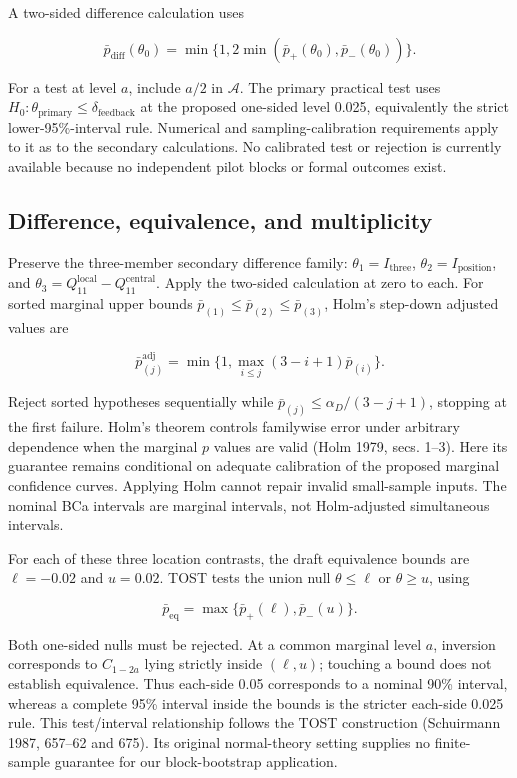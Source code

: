 \documentclass[
  english,
  11pt,
]{article}
\begin{document}
A two-sided difference calculation uses

\[
\bar p_{\mathrm{diff}}(\theta_0)=
\min\{1,2\min(\bar p_+(\theta_0),\bar p_-(\theta_0))\}.
\]

For a test at level \(a\), include \(a/2\) in \(\mathcal A\). The
primary practical test uses
\(H_0:\theta_{\mathrm{primary}}\leq\delta_{\mathrm{feedback}}\) at the
proposed one-sided level 0.025, equivalently the strict
lower-95\%-interval rule. Numerical and sampling-calibration
requirements apply to it as to the secondary calculations. No calibrated
test or rejection is currently available because no independent pilot
blocks or formal outcomes exist.

\subsection{Difference, equivalence, and
multiplicity}\label{difference-equivalence-and-multiplicity}

Preserve the three-member secondary difference family:
\(\theta_1=I_{\mathrm{three}}\), \(\theta_2=I_{\mathrm{position}}\), and
\(\theta_3=Q_{11}^{\mathrm{local}}-Q_{11}^{\mathrm{central}}\). Apply
the two-sided calculation at zero to each. For sorted marginal upper
bounds \(\bar p_{(1)}\leq\bar p_{(2)}\leq\bar p_{(3)}\), Holm's
step-down adjusted values are

\[
\bar p^{\mathrm{adj}}_{(j)}=
\min\{1,\max_{i\leq j}(3-i+1)\bar p_{(i)}\}.
\]

Reject sorted hypotheses sequentially while
\(\bar p_{(j)}\leq\alpha_D/(3-j+1)\), stopping at the first failure.
Holm's theorem controls familywise error under arbitrary dependence when
the marginal \(p\) values are valid (Holm 1979, secs. 1--3). Here its
guarantee remains conditional on adequate calibration of the proposed
marginal confidence curves. Applying Holm cannot repair invalid
small-sample inputs. The nominal BCa intervals are marginal intervals,
not Holm-adjusted simultaneous intervals.

For each of these three location contrasts, the draft equivalence bounds
are \(\ell=-0.02\) and \(u=0.02\). TOST tests the union null
\(\theta\leq\ell\) or \(\theta\geq u\), using

\[
\bar p_{\mathrm{eq}}=\max\{\bar p_+(\ell),\bar p_-(u)\}.
\]

Both one-sided nulls must be rejected. At a common marginal level \(a\),
inversion corresponds to \(C_{1-2a}\) lying strictly inside
\((\ell,u)\); touching a bound does not establish equivalence. Thus
each-side 0.05 corresponds to a nominal 90\% interval, whereas a
complete 95\% interval inside the bounds is the stricter each-side 0.025
rule. This test/interval relationship follows the TOST construction
(Schuirmann 1987, 657--62 and 675). Its original normal-theory setting
supplies no finite-sample guarantee for our block-bootstrap application.
\end{document}
